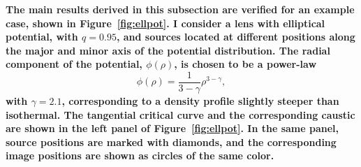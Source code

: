 \documentclass[usenatbib]{mnras}
\def\Fref#1{Figure~\ref{#1}\xspace}
\begin{document}
{\bf 
The main results derived in this subsection are verified for an example case, shown in \Fref{fig:ellpot}. I consider a lens with elliptical potential, with $q=0.95$, and sources located at different positions along the major and minor axis of the potential distribution.
The radial component of the potential, $\phi(\rho)$, is chosen to be a power-law
\begin{equation}\label{eq:ellpot_powerlawpot}
\phi(\rho) = \frac{1}{3-\gamma}\rho^{3-\gamma},
\end{equation}
with $\gamma=2.1$, corresponding to a density profile slightly steeper than isothermal.
The tangential critical curve and the corresponding caustic are shown in the left panel of \Fref{fig:ellpot}. In the same panel, source positions are marked with diamonds, and the corresponding image positions are shown as circles of the same color.

}
\end{document}
